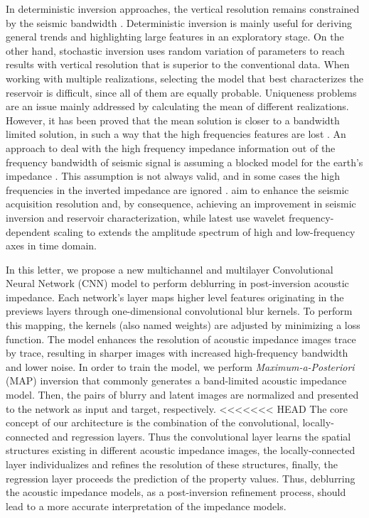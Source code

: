 \documentclass[journal]{IEEEtran}
\begin{document}
In deterministic inversion approaches, the vertical resolution
remains constrained by the seismic bandwidth \cite{Sancevero2005}.
Deterministic inversion is mainly useful for deriving general
trends and highlighting large features in an exploratory stage.
On the other hand, stochastic inversion uses random variation
of parameters to reach results with vertical resolution that is
superior to the conventional data. When working with multiple
realizations, selecting the model that best characterizes the
reservoir is difficult, since all of them are equally probable.
Uniqueness problems are an issue mainly addressed by calculating
the mean of different realizations. However, it has been proved
that the mean solution is closer to a bandwidth limited solution,
in such a way that the high frequencies features are lost
\cite{Cook2010}. An approach to deal with the high frequency
impedance information out of the frequency bandwidth of seismic signal
is assuming a blocked model for the earth's impedance \cite{Cook2010}.
This assumption is not always valid, and in some cases the high
frequencies in the inverted impedance are ignored \cite{YuanWang2015}.
\cite{xiaoiu} aim to enhance the seismic acquisition resolution and, by
consequence, achieving an improvement in seismic inversion and
reservoir characterization, while \cite{ChenWang2018} latest use wavelet
frequency-dependent scaling to extends the amplitude spectrum of
high and low-frequency axes in time domain. 

In this letter, we propose a new multichannel and multilayer
Convolutional Neural Network (CNN) model to perform deblurring
in post-inversion acoustic impedance. Each network's layer maps
higher level features originating in the previews layers through
one-dimensional convolutional blur kernels. To perform this
mapping, the kernels (also named weights) are adjusted by
minimizing a loss function. The model enhances the resolution
of acoustic impedance images trace by trace, resulting in sharper
images with increased high-frequency bandwidth and lower noise.
In order to train the model, we perform \textit{Maximum-a-Posteriori} (MAP)
inversion that commonly generates a band-limited acoustic impedance model.
Then, the pairs of blurry and latent images are normalized and 
presented to the network as input and target, respectively.
<<<<<<< HEAD
The core concept of our architecture is the combination of the
convolutional, locally-connected and regression layers. Thus
the convolutional layer learns the spatial structures existing
in different acoustic impedance images, the locally-connected
layer individualizes and refines the resolution of these structures,
finally, the regression layer proceeds the prediction of the property values.
Thus, deblurring the acoustic impedance models, as a post-inversion
refinement process, should lead to a more accurate interpretation
of the impedance models.
\end{document}
